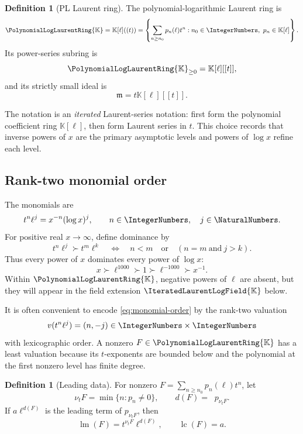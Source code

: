 \documentclass[11pt,oneside]{article}
\numberwithin{equation}{section}
\theoremstyle{definition}
\newtheorem{definition}[theorem]{Definition}
\newcommand{\K}{\mathbb{K}}
\newcommand{\PL}{\PolynomialLogLaurentRing{\K}}
\newcommand{\HL}{\IteratedLaurentLogField{\K}}
\newcommand{\ordx}{\nu_t}
\newcommand{\lc}{\operatorname{lc}}
\newcommand{\LeadingMonomialOf}[1]{\operatorname{lm}\!\left(#1\right)}
\DeclareMathOperator{\degell}{deg_{\ell}}
\begin{document}
\begin{definition}[PL Laurent ring]
The polynomial-logarithmic Laurent ring is
\begin{equation}\label{eq:PL-ring}
  \PL=\K[\ell]((t))
  =\left\{\sum_{n\ge n_0}p_n(\ell)t^n:
      n_0\in\IntegerNumbers,\ p_n\in\K[\ell]\right\}.
\end{equation}
Its power-series subring is
\[
  {\PL}_{\ge0}=\K[\ell][[t]],
\]
and its strictly small ideal is
\[
  \mathfrak m=t\K[\ell][[t]].
\]
\end{definition}

The notation is an \emph{iterated} Laurent-series notation: first form the
polynomial coefficient ring \(\K[\ell]\), then form Laurent series in \(t\).
This choice records that inverse powers of \(x\) are the primary asymptotic
levels and powers of \(\log x\) refine each level.

\subsection{Rank-two monomial order}

The monomials are
\[
  t^n\ell^j=x^{-n}(\log x)^j,
  \qquad n\in\IntegerNumbers,\quad j\in\NaturalNumbers.
\]
For positive real \(x\to\infty\), define dominance by
\begin{equation}\label{eq:monomial-order}
  t^n\ell^j\succ t^m\ell^k
  \quad\Longleftrightarrow\quad
  n<m\quad\text{or}\quad(n=m\ \text{and}\ j>k).
\end{equation}
Thus every power of \(x\) dominates every power of \(\log x\):
\[
  x\succ \ell^{1000}\succ1\succ \ell^{-1000}\succ x^{-1}.
\]
Within \(\PL\), negative powers of \(\ell\) are absent, but they will appear in
the field extension \(\HL\) below.

It is often convenient to encode \eqref{eq:monomial-order} by the rank-two
valuation
\begin{equation}\label{eq:valuation-pair}
  v(t^n\ell^j)=(n,-j)\in\IntegerNumbers\times\IntegerNumbers
\end{equation}
with lexicographic order.  A nonzero \(F\in\PL\) has a least valuation because
its \(t\)-exponents are bounded below and the polynomial at the first nonzero
level has finite degree.

\begin{definition}[Leading data]
For nonzero
\(F=\sum_{n\ge n_0}p_n(\ell)t^n\), let
\[
  \ordx F=\min\{n:p_n\ne0\},\qquad
  d(F)=\degell p_{\ordx F}.
\]
If \(a\ell^{d(F)}\) is the leading term of
\(p_{\ordx F}\), then
\[
  \LeadingMonomialOf{F}=t^{\ordx F}\ell^{d(F)},\qquad
  \lc(F)=a.
\]
\end{definition}
\end{document}
